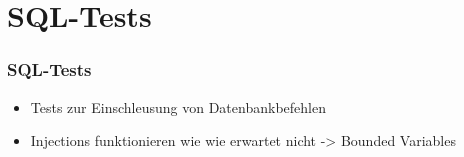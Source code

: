 \section*{SQL-Tests}

\begin{frame}\frametitle{SQL-Tests}
    \begin{itemize} 
        \item Tests zur Einschleusung von Datenbankbefehlen
        \item Injections funktionieren wie wie erwartet nicht -> Bounded Variables
    \end{itemize}
        
\end{frame}